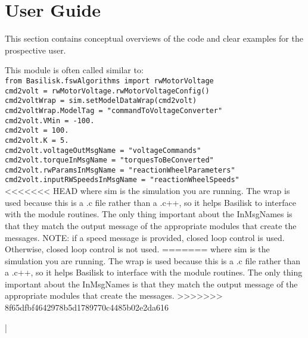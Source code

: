 \section{User Guide}
This section contains conceptual overviews of the code and clear examples for the prospective user. 

This module is often called similar to:\\
\verb|from Basilisk.fswAlgorithms import rwMotorVoltage|\\
\verb|cmd2volt = rwMotorVoltage.rwMotorVoltageConfig()|\\
\verb|cmd2voltWrap = sim.setModelDataWrap(cmd2volt)|\\
\verb|cmd2voltWrap.ModelTag = "commandToVoltageConverter"|\\
\verb|cmd2volt.VMin = -100.|\\
\verb|cmd2volt = 100.|\\
\verb|cmd2volt.K = 5.|\\
\verb|cmd2volt.voltageOutMsgName = "voltageCommands"|\\
\verb|cmd2volt.torqueInMsgName = "torquesToBeConverted"|\\
\verb|cmd2volt.rwParamsInMsgName = "reactionWheelParameters"|\\
\verb|cmd2volt.inputRWSpeedsInMsgName = "reactionWheelSpeeds"|\\

<<<<<<< HEAD
where sim is the simulation you are running. The wrap is used because this is a .c file rather than a .c++, so it helps Basilisk to interface with the module routines. The only thing important about the InMsgNames is that they match the output message of the appropriate modules that create the messages. NOTE: if a speed message is provided, closed loop control is used. Otherwise, closed loop control is not used.
=======
where sim is the simulation you are running. The wrap is used because this is a .c file rather than a .c++, so it helps Basilisk to interface with the module routines. The only thing important about the InMsgNames is that they match the output message of the appropriate modules that create the messages.
>>>>>>> 8f65dfbf4642978b5d1789770c4485b02e2da616


|
